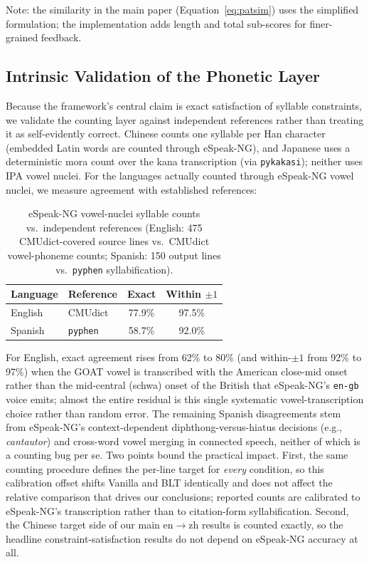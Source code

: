 \documentclass[11pt]{article}
\begin{document}
Note: the similarity in the main paper (Equation~\ref{eq:patsim}) uses the simplified formulation; the implementation adds length and total sub-scores for finer-grained feedback.

\subsection{Intrinsic Validation of the Phonetic Layer}
\label{app:tools-validation}

Because the framework's central claim is exact satisfaction of syllable constraints, we validate the counting layer against independent references rather than treating it as self-evidently correct.
Chinese counts one syllable per Han character (embedded Latin words are counted through eSpeak-NG), and Japanese uses a deterministic mora count over the kana transcription (via \texttt{pykakasi}); neither uses IPA vowel nuclei.
For the languages actually counted through eSpeak-NG vowel nuclei, we measure agreement with established references:

\begin{table}[h]
\centering
\small
\begin{tabular}{@{}llcc@{}}
\toprule
\textbf{Language} & \textbf{Reference} & \textbf{Exact} & \textbf{Within $\pm1$} \\
\midrule
English & CMUdict & 77.9\% & 97.5\% \\
Spanish & \texttt{pyphen} & 58.7\% & 92.0\% \\
\bottomrule
\end{tabular}
\caption{eSpeak-NG vowel-nuclei syllable counts vs.\ independent references (English: 475 CMUdict-covered source lines vs.\ CMUdict vowel-phoneme counts; Spanish: 150 output lines vs.\ \texttt{pyphen} syllabification).}
\label{tab:phonetic-validation}
\end{table}

For English, exact agreement rises from 62\% to 80\% (and within-$\pm1$ from 92\% to 97\%) when the GOAT vowel is transcribed with the American close-mid onset \textipa{[oU]} rather than the mid-central (schwa) onset of the British \textipa{[@U]} that eSpeak-NG's \texttt{en-gb} voice emits; almost the entire residual is this single systematic vowel-transcription choice rather than random error.
The remaining Spanish disagreements stem from eSpeak-NG's context-dependent diphthong-versus-hiatus decisions (e.g., \emph{cantautor}) and cross-word vowel merging in connected speech, neither of which is a counting bug per se.
Two points bound the practical impact.
First, the same counting procedure defines the per-line target for \emph{every} condition, so this calibration offset shifts Vanilla and BLT identically and does not affect the relative comparison that drives our conclusions; reported counts are calibrated to eSpeak-NG's transcription rather than to citation-form syllabification.
Second, the Chinese target side of our main en$\rightarrow$zh results is counted exactly, so the headline constraint-satisfaction results do not depend on eSpeak-NG accuracy at all.
\end{document}

